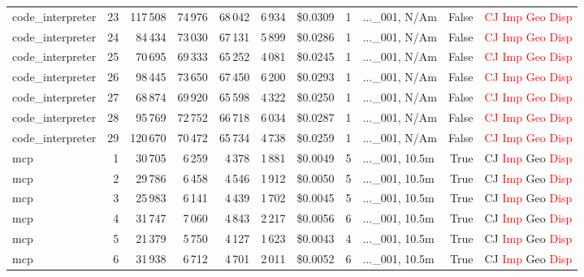 \documentclass[a4paper,11pt]{article}
\begin{document}
\begin{table}[H]
{\begin{tabular}{l r r r r r r r l r l}
code\_interpreter & 23 & 117\,508 & 74\,976 & 68\,042 & 6\,934 & \$0.0309 & 1 & ...\_001, N/Am & False & \textcolor{red}{CJ} \textcolor{red}{Imp} \textcolor{red}{Geo} \textcolor{red}{Disp} \\
code\_interpreter & 24 & 84\,434 & 73\,030 & 67\,131 & 5\,899 & \$0.0286 & 1 & ...\_001, N/Am & False & \textcolor{red}{CJ} \textcolor{red}{Imp} \textcolor{red}{Geo} \textcolor{red}{Disp} \\
code\_interpreter & 25 & 70\,695 & 69\,333 & 65\,252 & 4\,081 & \$0.0245 & 1 & ...\_001, N/Am & False & \textcolor{red}{CJ} \textcolor{red}{Imp} \textcolor{red}{Geo} \textcolor{red}{Disp} \\
code\_interpreter & 26 & 98\,445 & 73\,650 & 67\,450 & 6\,200 & \$0.0293 & 1 & ...\_001, N/Am & False & \textcolor{red}{CJ} \textcolor{red}{Imp} \textcolor{red}{Geo} \textcolor{red}{Disp} \\
code\_interpreter & 27 & 68\,874 & 69\,920 & 65\,598 & 4\,322 & \$0.0250 & 1 & ...\_001, N/Am & False & \textcolor{red}{CJ} \textcolor{red}{Imp} \textcolor{red}{Geo} \textcolor{red}{Disp} \\
code\_interpreter & 28 & 95\,769 & 72\,752 & 66\,718 & 6\,034 & \$0.0287 & 1 & ...\_001, N/Am & False & \textcolor{red}{CJ} \textcolor{red}{Imp} \textcolor{red}{Geo} \textcolor{red}{Disp} \\
code\_interpreter & 29 & 120\,670 & 70\,472 & 65\,734 & 4\,738 & \$0.0259 & 1 & ...\_001, N/Am & False & \textcolor{red}{CJ} \textcolor{red}{Imp} \textcolor{red}{Geo} \textcolor{red}{Disp} \\
\midrule
mcp & 1 & 30\,705 & 6\,259 & 4\,378 & 1\,881 & \$0.0049 & 5 & ...\_001, 10.5m & True & CJ \textcolor{red}{Imp} Geo \textcolor{red}{Disp} \\
mcp & 2 & 29\,786 & 6\,458 & 4\,546 & 1\,912 & \$0.0050 & 5 & ...\_001, 10.5m & True & CJ \textcolor{red}{Imp} Geo \textcolor{red}{Disp} \\
mcp & 3 & 25\,983 & 6\,141 & 4\,439 & 1\,702 & \$0.0045 & 5 & ...\_001, 10.5m & True & CJ \textcolor{red}{Imp} Geo \textcolor{red}{Disp} \\
mcp & 4 & 31\,747 & 7\,060 & 4\,843 & 2\,217 & \$0.0056 & 6 & ...\_001, 10.5m & True & CJ \textcolor{red}{Imp} Geo \textcolor{red}{Disp} \\
mcp & 5 & 21\,379 & 5\,750 & 4\,127 & 1\,623 & \$0.0043 & 4 & ...\_001, 10.5m & True & CJ \textcolor{red}{Imp} Geo \textcolor{red}{Disp} \\
mcp & 6 & 31\,938 & 6\,712 & 4\,701 & 2\,011 & \$0.0052 & 6 & ...\_001, 10.5m & True & CJ \textcolor{red}{Imp} Geo \textcolor{red}{Disp} \\

\end{tabular}}
\end{table}
\end{document}
